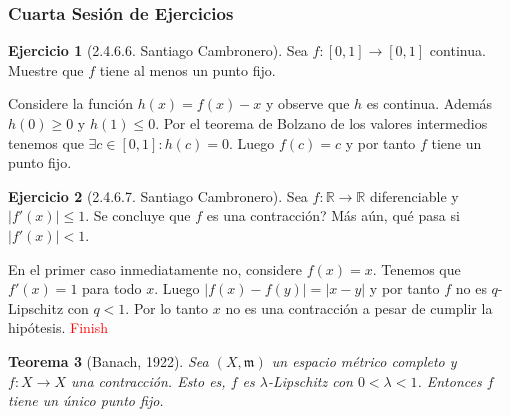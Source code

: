 \documentclass[12pt]{article}
\theoremstyle{plain}
\newtheorem{Th}{Teorema}[subsection]   %
\theoremstyle{definition}
\newtheorem{Ej}[Th]{Ejercicio}
\theoremstyle{remark}
\numberwithin{equation}{section}
\newcommand{\la}{\lambda}           %
\newcommand{\bR}{\mathbb{R}}        %
\newcommand{\mm}{\mathfrak{m}}      %
\renewcommand{\geq}{\geqslant}      %
\renewcommand{\leq}{\leqslant}      %
\renewcommand{\:}{\colon}           %
\newcommand{\bonj}[1]{\left\lbrack#1\right\rbrack}
\begin{document}
\begin{multicols}{2}
\subsubsection*{Cuarta Sesión de Ejercicios}

 \begin{Ej}[2.4.6.6. Santiago Cambronero]
   Sea $f\colon\bonj{0,1}\to\bonj{0,1}$ continua. Muestre que $f$ tiene al menos un punto fijo.
 \end{Ej}

 \begin{ptcb}
Considere la función $h(x)=f(x)-x$ y observe que $h$ es continua. Además $h(0)\geq 0$ y $h(1)\leq 0$. Por el teorema de Bolzano de los valores intermedios tenemos que $\exists c\in\bonj{0,1}\colon h(c)=0$. Luego $f(c)=c$ y por tanto $f$ tiene un punto fijo.
 \end{ptcb}

 \begin{Ej}[2.4.6.7. Santiago Cambronero]
   Sea $f\colon\bR\to\bR$ diferenciable y $|f'(x)|\leq 1$. Se concluye que $f$ es una contracción? Más aún, qué pasa si $|f'(x)|< 1$.
 \end{Ej}

 \begin{ptcb}
En el primer caso inmediatamente no, considere $f(x)=x$. Tenemos que $f'(x)=1$ para todo $x$. Luego $|f(x)-f(y)|=|x-y|$ y por tanto $f$ no es $q$-Lipschitz con $q<1$. Por lo tanto $x$ no es una contracción a pesar de cumplir la hipótesis.
\textcolor{red}{Finish}
 \end{ptcb}




\begin{Th}[Banach, 1922]
  Sea $(X,\mm)$ un espacio métrico completo y $f\colon X\to X$ una contracción. Esto es, $f$ es $\la$-Lipschitz con $0<\la<1$. Entonces $f$ tiene un único punto fijo.
\end{Th}


\end{multicols}
\end{document}
